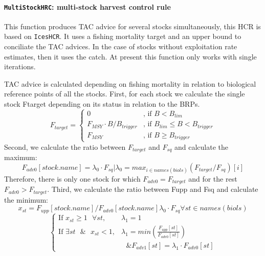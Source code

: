   \paragraph{\texttt{MultiStockHRC}: multi-stock harvest control rule} \hspace{0pt} \smallskip

  This function produces TAC advice for several stocks simultaneously, this HCR is based on \texttt{IcesHCR}. 
  It uses a fishing mortality target and an upper bound to conciliate the TAC advices. In the case of stocks without exploitation rate estimates, then it uses the catch. At present this function only works with single iterations.
  
  
  TAC advice is calculated depending on fishing mortality in relation to biological reference points of all the stocks.
  First, for each stock we calculate the single stock  Ftarget depending on its status in relation to the BRPs.
    \begin{equation}
    	F_{target} =
    	\begin{cases}
  				0                              & \text{, if } B < B_{lim} \\
  				F_{MSY} \cdot  B / B_{trigger} & \text{, if } B_{lim} \leq B < B_{trigger} \\
  				F_{MSY}                        & \text{, if } B \geq B_{trigger}
    	\end{cases}
    \end{equation}
  Second, we calculate the ratio between $F_{target}$ and $F_{sq}$ and calculate the maximum:
    \begin{equation}
    	F_{adv0}[stock.name] = \lambda_0 \cdot F_{sq} | \lambda_0 = max_{i \in names(biols)}(F_{target}/F_{sq})[i]
    \end{equation}
  Therefore, there is only one stock for which $F_{adv0} = F_{target}$ and for the rest $F_{adv0} > F_{target}$.
  Third, we calculate the ratio between Fupp and Fsq and calculate the minimum:
    \begin{equation}
    	x_{st} = F_{upp}[stock.name] /  F_{adv0}[stock.name]\lambda_0 \cdot F_{sq} \forall st \in names(biols)
    \end{equation}
    \begin{equation}
       \begin{cases}
  			  \text{If } x_{st} \geq 1  \text{ } \forall st,
  			          & \lambda_1 = 1 \\
  			  \text{If } \exists st \text{ } \& \text{ }  x_{st} < 1,
  			          & \lambda_1 = min(\frac{F_{upp}[st]}{F_{adv0}[st]}) \\
  			          & \text{ } \& F_{adv1}[st] = \lambda_1 \cdot F_{adv0}[st]
    	\end{cases}
    \end{equation}
